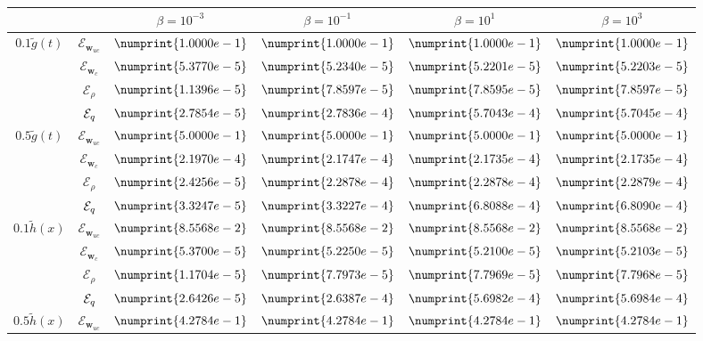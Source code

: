\begin{table}
\begin{tabular}{ | c | c || c | c | c | c ||}
\hline
  \multicolumn{2}{|c||}{} & $\beta = 10^{-3}$ & $\beta = 10^{-1}$ & $\beta = 10^{1}$ & $\beta = 10^{3}$  \\
\hline
\hline
\multirow{4}{*}{$0.1 \tilde g(t)$} & $\mathcal{E}_{\mathbf{w}_{uc}}$ & $\numprint{1.0000e-1}$ & $\numprint{1.0000e-1}$ & $\numprint{1.0000e-1}$ & $\numprint{1.0000e-1}$ \\
 & $\mathcal{E}_{\mathbf{w}_c}$ & $\numprint{5.3770e-5}$ & $\numprint{5.2340e-5}$ & $\numprint{5.2201e-5}$ & $\numprint{5.2203e-5}$ \\
 & $\mathcal{E}_{\rho}$ & $\numprint{1.1396e-5}$ & $\numprint{7.8597e-5}$ & $\numprint{7.8595e-5}$ & $\numprint{7.8597e-5}$ \\
 & $\mathcal{E}_{q}$ & $\numprint{2.7854e-5}$ & $\numprint{2.7836e-4}$ & $\numprint{5.7043e-4}$ & $\numprint{5.7045e-4}$ \\
\hline
\multirow{4}{*}{$0.5 \tilde g(t)$} & $\mathcal{E}_{\mathbf{w}_{uc}}$ & $\numprint{5.0000e-1}$ & $\numprint{5.0000e-1}$ & $\numprint{5.0000e-1}$ & $\numprint{5.0000e-1}$ \\
 & $\mathcal{E}_{\mathbf{w}_c}$ & $\numprint{2.1970e-4}$ & $\numprint{2.1747e-4}$ & $\numprint{2.1735e-4}$ & $\numprint{2.1735e-4}$ \\
 & $\mathcal{E}_{\rho}$ & $\numprint{2.4256e-5}$ & $\numprint{2.2878e-4}$ & $\numprint{2.2878e-4}$ & $\numprint{2.2879e-4}$ \\
 & $\mathcal{E}_{q}$ & $\numprint{3.3247e-5}$ & $\numprint{3.3227e-4}$ & $\numprint{6.8088e-4}$ & $\numprint{6.8090e-4}$ \\
\hline
\multirow{4}{*}{$0.1 \tilde h(x)$} & $\mathcal{E}_{\mathbf{w}_{uc}}$ & $\numprint{8.5568e-2}$ & $\numprint{8.5568e-2}$ & $\numprint{8.5568e-2}$ & $\numprint{8.5568e-2}$ \\
 & $\mathcal{E}_{\mathbf{w}_c}$ & $\numprint{5.3700e-5}$ & $\numprint{5.2250e-5}$ & $\numprint{5.2100e-5}$ & $\numprint{5.2103e-5}$ \\
 & $\mathcal{E}_{\rho}$ & $\numprint{1.1704e-5}$ & $\numprint{7.7973e-5}$ & $\numprint{7.7969e-5}$ & $\numprint{7.7968e-5}$ \\
 & $\mathcal{E}_{q}$ & $\numprint{2.6426e-5}$ & $\numprint{2.6387e-4}$ & $\numprint{5.6982e-4}$ & $\numprint{5.6984e-4}$ \\
\hline
\multirow{4}{*}{$0.5 \tilde h(x)$} & $\mathcal{E}_{\mathbf{w}_{uc}}$ & $\numprint{4.2784e-1}$ & $\numprint{4.2784e-1}$ & $\numprint{4.2784e-1}$ & $\numprint{4.2784e-1}$ \\

\end{tabular}
\end{table}
